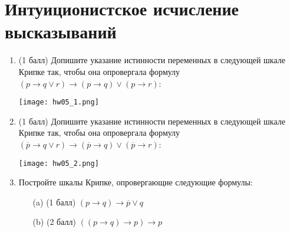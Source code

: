 \section{Интуиционистское исчисление высказываний}
\begin{enumerate}
    \item (1 балл) Допишите указание истинности переменных в следующей шкале Крипке так,
    чтобы она опровергала формулу $(p \rightarrow q \lor r) \rightarrow (p \rightarrow q) \lor (p \rightarrow r)$:
    \begin{center}
        \texttt{[image: hw05\_1.png]}
    \end{center}
    \item (1 балл) Допишите указание истинности переменных в следующей шкале Крипке так,
    чтобы она опровергала формулу $(\overline{p} \rightarrow q \lor r) \rightarrow (\overline{p} \rightarrow q) \lor (\overline{p} \rightarrow r)$:
    \begin{center}
        \texttt{[image: hw05\_2.png]}
    \end{center}
    \item Постройте шкалы Крипке, опровергающие следующие формулы:
    \begin{itemize}
        \item[(a)] (1 балл) $(p \rightarrow q) \rightarrow \overline{p} \lor q$
        \item[(b)] (2 балл) $((p \rightarrow q) \rightarrow p) \rightarrow p$
    \end{itemize}
\end{enumerate}
\clearpage
